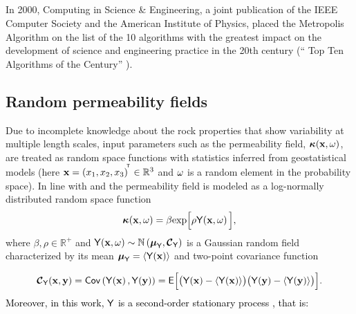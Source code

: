 \subsection{\mcmc}

In 2000, Computing in Science \& Engineering, a joint publication of the IEEE Computer Society and the American Institute of Physics, placed the Metropolis Algorithm on the list of the 10 algorithms with the greatest impact on the development of science and engineering practice in the 20th century (“ Top Ten Algorithms of the Century”  \citep{top10}).

\subsection{Random permeability fields}\label{fieldgeneratio}

Due to incomplete knowledge about the rock properties that show variability at multiple length scales, input parameters such as the permeability field, $\boldsymbol{\kappa}(\mathbf{x},\omega)$, are treated as random space functions with statistics inferred from geostatistical models (here $\mathbf{x} =\left( x_{1},x_{2},x_{3}  \right)^{\! ^{\mathsf{T}}}\in \mathbb{R}^{3}$ and $\omega$ is a random element in the probability space).
In line with \cite{dagan89} and \cite{gelhar93} the permeability field is modeled as a log-normally distributed random space function
%
\begin{equation}
  \boldsymbol{\kappa}\!\left(\mathbf{x},\omega\right) = \beta\mbox{exp}\Big[\rho\mathsf{Y}\!\left(\mathbf{x},\omega\right)\Big],
\label{field}
\end{equation}
%
\noindent where $\beta,\rho\in\mathbb{R}^{+}$ and $\mathsf{Y}\!\left(\mathbf{x},\omega\right) \sim \mathbb{N}\left({\boldsymbol{\mu}_{\mathsf{Y}}},{\boldmath{\mbox{$\mathcal{C}$}}}_{\mathsf{Y}}\right)$ is a Gaussian random field
characterized by its mean ${\boldsymbol{\mu}_{\mathsf{Y}}} = \langle {\mathsf{Y}\!\left(\mathbf{x}\right)} \rangle$ and two-point covariance function

\begin{equation}
 {\boldmath{\mbox{$\mathcal{C}$}}}_{\mathsf{Y}}(\mathbf{x}, \mathbf{y}) = \mathsf{Cov}\left( \mathsf{Y}\!\left(\mathbf{x}\right), \mathsf{Y}\!\left(\mathbf{y}\right) \right) = \mathsf{E}\Big[ \big( \mathsf{Y}\!\left(\mathbf{x}\right) - \langle {\mathsf{Y}\!\left(\mathbf{x}\right)} \rangle  \big) \big( \mathsf{Y}\!\left(\mathbf{y}\right) - \langle {\mathsf{Y}\!\left(\mathbf{y}\right)} \rangle  \big) \Big].
 \label{covg}
\end{equation}
%
\textcolor{black}{Moreover, in this work, $\mathsf{Y}$ is a second-order stationary process \citep{gelhar93}, that is:}

